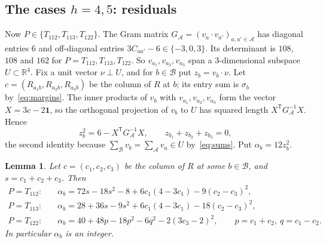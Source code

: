 \documentclass[11pt,a4paper]{amsart}
\newtheorem{lemma}[theorem]{Lemma}
\theoremstyle{definition}
\theoremstyle{remark}
\newcommand{\R}{\mathbb{R}}
\newcommand{\one}{\mathbf{1}}
\newcommand{\cA}{\mathcal{A}}
\newcommand{\cB}{\mathcal{B}}
\newcommand{\T}{\mathsf{T}}
\begin{document}
\subsection{The cases \texorpdfstring{$h=4,5$}{h=4,5}: residuals}

Now $P\in\{T_{112},T_{113},T_{122}\}$. The Gram matrix $G_\cA=(v_{a}\cdot v_{a'})_{a,a'\in\cA}$ has diagonal
entries $6$ and off-diagonal entries $3C_{aa'}-6\in\{-3,0,3\}$. Its determinant is $108$, $108$ and $162$ for
$P=T_{112},T_{113},T_{122}$. So $v_{a_1},v_{a_2},v_{a_3}$ span a $3$-dimensional subspace $U\subset\R^4$. Fix a
unit vector $\nu\perp U$, and for $b\in\cB$ put $z_b=v_b\cdot\nu$. Let $c=(R_{a_1b},R_{a_2b},R_{a_3b})$ be the
column of $R$ at $b$; its entry sum is $\sigma_b$ by~\eqref{eq:margins}. The inner products of $v_b$ with
$v_{a_1},v_{a_2},v_{a_3}$ form the vector $X=3c-2\one$, so the orthogonal projection of $v_b$ to $U$ has squared
length $X^{\T}G_\cA^{-1}X$. Hence
\begin{equation}\label{eq:resid}
z_b^2=6-X^{\T}G_\cA^{-1}X,\qquad z_{b_1}+z_{b_2}+z_{b_3}=0,
\end{equation}
the second identity because $\sum_\cB v_b=\sum_\cA v_a\in U$ by~\eqref{eq:sums}. Put $\alpha_b=12z_b^2$.

\begin{lemma}\label{lem:alpha}
Let $c=(c_1,c_2,c_3)$ be the column of $R$ at some $b\in\cB$, and $s=c_1+c_2+c_3$. Then
\begin{align*}
P=T_{112}:&\quad \alpha_b=72s-18s^2-8+6c_1(4-3c_1)-9(c_2-c_3)^2,\\
P=T_{113}:&\quad \alpha_b=28+36s-9s^2+6c_1(4-3c_1)-18(c_2-c_3)^2,\\
P=T_{122}:&\quad \alpha_b=40+48p-18p^2-6q^2-2(3c_3-2)^2,\qquad p=c_1+c_2,\ q=c_1-c_2.
\end{align*}
In particular $\alpha_b$ is an integer.
\end{lemma}
\end{document}
